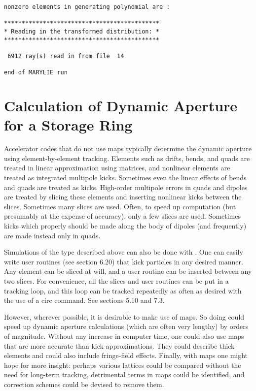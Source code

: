 \begin{footnotesize}
\begin{verbatim}
nonzero elements in generating polynomial are :

********************************************
* Reading in the transformed distribution: *
********************************************

 6912 ray(s) read in from file  14

end of MARYLIE run
\end{verbatim}
\end{footnotesize}

\section{Calculation of Dynamic Aperture for a Storage Ring} 
\label{aperture}
Accelerator codes that do not use maps typically determine the dynamic
aperture using element-by-element tracking.  Elements such as drifts, bends, and
quads are treated in linear approximation using matrices, and nonlinear elements
are treated as integrated multipole kicks.  Sometimes even the linear effects
of bends and quads are treated as kicks.  High-order multipole errors in
quads and dipoles are treated by slicing these elements and inserting nonlinear
kicks between the slices.  Sometimes many slices are used.  Often, to speed up
computation (but presumably at the expense of accuracy), only a few slices
are used.  Sometimes kicks which properly should be made along the body of
dipoles (and frequently) are made instead only in quads.

Simulations of the type described above can also be done with \Mary.  One
can easily write user routines (see section 6.20) that kick particles in
any desired manner.  Any element can be sliced at will, and a user routine can
be inserted between any two slices.  For convenience, all the slices and user
routines can be put in a tracking loop, and this loop can be tracked
repeatedly as often as desired with the use of a circ command.  See sections 5.10 and
7.3.

However, wherever possible, it is desirable to make use of maps.  So doing
could speed up dynamic aperture calculations (which are often very
lengthy) by orders of magnitude.  Without any increase in computer time, one could
also use maps that are more accurate than kick approximations.  They could describe
thick elements and could also include fringe-field effects.  Finally, with maps
one might hope for more insight: perhaps various lattices could be compared
without the need for long-term tracking, detrimental terms in maps could be
identified, and correction schemes could be devised to remove them.

